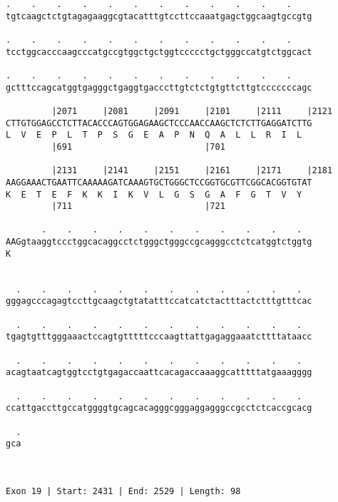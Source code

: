 \documentclass{article}
\begin{document}
\begin{Verbatim}
.    .    .    .    .    .    .    .    .    .    .    .    
tgtcaagctctgtagagaaggcgtacatttgtccttccaaatgagctggcaagtgccgtg
                                                            
.    .    .    .    .    .    .    .    .    .    .    .    
tcctggcacccaagcccatgccgtggctgctggtccccctgctgggccatgtctggcact
                                                            
.    .    .    .    .    .    .    .    .    .    .    .    
gctttccagcatggtgagggctgaggtgacccttgtctctgtgttcttgtcccccccagc
                                                            
         |2071     |2081     |2091     |2101     |2111     |2121
CTTGTGGAGCCTCTTACACCCAGTGGAGAAGCTCCCAACCAAGCTCTCTTGAGGATCTTG
L  V  E  P  L  T  P  S  G  E  A  P  N  Q  A  L  L  R  I  L  
         |691                          |701                 
  
         |2131     |2141     |2151     |2161     |2171     |2181
AAGGAAACTGAATTCAAAAAGATCAAAGTGCTGGGCTCCGGTGCGTTCGGCACGGTGTAT
K  E  T  E  F  K  K  I  K  V  L  G  S  G  A  F  G  T  V  Y  
         |711                          |721                 
  
       .    .    .    .    .    .    .    .    .    .    .  
AAGgtaaggtccctggcacaggcctctgggctgggccgcagggcctctcatggtctggtg
K                                                           
                                                            
  
  .    .    .    .    .    .    .    .    .    .    .    .  
gggagcccagagtccttgcaagctgtatatttccatcatctactttactctttgtttcac
                                                            
  .    .    .    .    .    .    .    .    .    .    .    .  
tgagtgtttgggaaactccagtgtttttcccaagttattgagaggaaatcttttataacc
                                                            
  .    .    .    .    .    .    .    .    .    .    .    .  
acagtaatcagtggtcctgtgagaccaattcacagaccaaaggcatttttatgaaagggg
                                                            
  .    .    .    .    .    .    .    .    .    .    .    .  
ccattgaccttgccatggggtgcagcacagggcgggaggagggccgcctctcaccgcacg
                                                            
  .
gca
   
   
 
Exon 19 | Start: 2431 | End: 2529 | Length: 98




\end{Verbatim}
\end{document}
